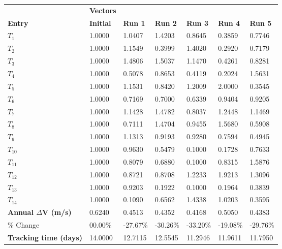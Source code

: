 \begin{table}[H]
\centering
\begin{tabular}{lllllll}
\textbf{} & \cellcolor[HTML]{EFEFEF}\textbf{Vectors} & \textbf{} & \textbf{} & \textbf{} & \textbf{} & \textbf{} \\
\rowcolor[HTML]{EFEFEF} \cellcolor[HTML]{EFEFEF}\textbf{Entry} & \cellcolor[HTML]{EFEFEF}\textbf{Initial} & \cellcolor[HTML]{EFEFEF}\textbf{Run 1} & \cellcolor[HTML]{EFEFEF}\textbf{Run 2} & \cellcolor[HTML]{EFEFEF}\textbf{Run 3} & \cellcolor[HTML]{EFEFEF}\textbf{Run 4} & \cellcolor[HTML]{EFEFEF}\textbf{Run 5} \\
$T_{1}$ & 1.0000 & 1.0407 & 1.4203 & 0.8645 & 0.3859 & 0.7746 \\
$T_{2}$ & 1.0000 & 1.1549 & 0.3999 & 1.4020 & 0.2920 & 0.7179 \\
$T_{3}$ & 1.0000 & 1.4806 & 1.5037 & 1.1470 & 0.4261 & 0.8281 \\
$T_{4}$ & 1.0000 & 0.5078 & 0.8653 & 0.4119 & 0.2024 & 1.5631 \\
$T_{5}$ & 1.0000 & 1.1531 & 0.8420 & 1.2009 & 2.0000 & 0.3545 \\
$T_{6}$ & 1.0000 & 0.7169 & 0.7000 & 0.6339 & 0.9404 & 0.9205 \\
$T_{7}$ & 1.0000 & 1.1428 & 1.4782 & 0.8037 & 1.2448 & 1.1469 \\
$T_{8}$ & 1.0000 & 0.7111 & 1.4704 & 0.9455 & 1.5680 & 0.5908 \\
$T_{9}$ & 1.0000 & 1.1313 & 0.9193 & 0.9280 & 0.7594 & 0.4945 \\
$T_{10}$ & 1.0000 & 0.9630 & 0.5479 & 0.1000 & 0.1728 & 0.7633 \\
$T_{11}$ & 1.0000 & 0.8079 & 0.6880 & 0.1000 & 0.8315 & 1.5876 \\
$T_{12}$ & 1.0000 & 0.8721 & 0.8708 & 1.2233 & 1.9213 & 1.3096 \\
$T_{13}$ & 1.0000 & 0.9203 & 0.1922 & 0.1000 & 0.1964 & 0.3839 \\
$T_{14}$ & 1.0000 & 0.1090 & 0.6562 & 1.4338 & 1.0203 & 0.3595 \\
\rowcolor[HTML]{EFEFEF} 
\cellcolor[HTML]{EFEFEF}\textbf{Annual $\Delta \boldsymbol{V}$ (m/s)} & \cellcolor[HTML]{EFEFEF}0.6240 & 0.4513 & 0.4352 & 0.4168 & 0.5050 & 0.4383 \\
\% Change & 00.00\% &-27.67\% & -30.26\% & -33.20\% & -19.08\% & -29.76\% \\
\rowcolor[HTML]{EFEFEF} 
\cellcolor[HTML]{EFEFEF}\textbf{Tracking time (days)} & \cellcolor[HTML]{EFEFEF}14.0000 & 12.7115 & 12.5545 & 11.2946 & 11.9611 & 11.7950 \\

\end{tabular}
\end{table}
